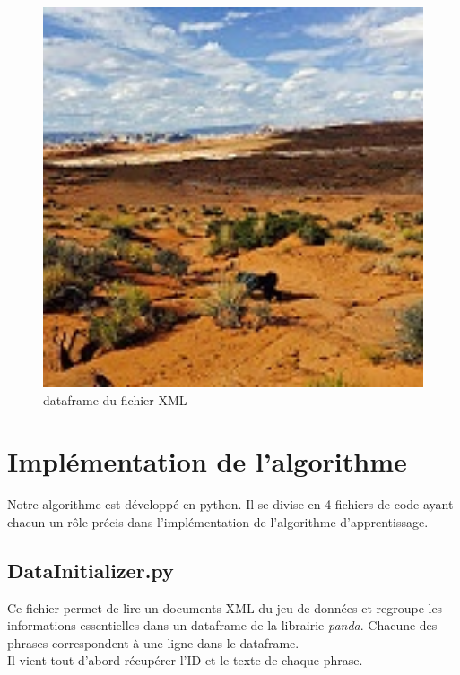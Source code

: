 \documentclass[12pt ,a4paper ]{article}
\begin{document}
\begin{multicols}{2}
\begin{figure}[th]
    \begin{center}
        \includegraphics[width=1\textwidth]{3808.jpg}
    \end{center}
\caption{\small{dataframe du fichier XML}}
\end{figure}
\newpage
\section{Implémentation de l'algorithme}
Notre algorithme est développé en python. Il se divise en 4 fichiers de code ayant chacun un rôle précis dans l'implémentation de l'algorithme d'apprentissage. 

\subsection{DataInitializer.py}
Ce fichier permet de lire un documents XML du jeu de données et regroupe les informations essentielles dans un dataframe de la librairie \textit{panda}. Chacune des phrases correspondent à une ligne dans le dataframe. \\

\noindent Il vient tout d'abord récupérer l'ID et le texte de chaque phrase. \\


\end{multicols}
\end{document}
